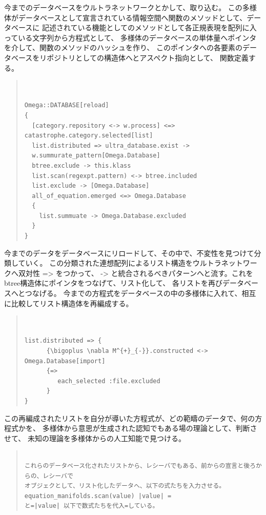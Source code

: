 \documentclass{jsarticle}
\begin{document}
{今までのデータベースをウルトラネットワークとかして、取り込む。
この多様体がデータベースとして宣言されている情報空間へ関数のメソッドとして、データベースに
記述されている機能としてのメソッドとして各正規表現を配列に入っている文字列から方程式として、
多様体のデータベースの単体量へポインタを介して、関数のメソッドのハッシュを作り、
このポインタへの各要素のデータベースをリポジトリとしての構造体へとアスペクト指向として、
関数定義する。

\begin{quote}
\setlength{\baselineskip}{12pt}
\begin{verbatim}


Omega::DATABASE[reload]
{ 
  [category.repository <-> w.process] <=> catastrophe.category.selected[list]
  list.distributed => ultra_database.exist -> 
  w.summurate_pattern[Omega.Database]
  btree.exclude -> this.klass
  list.scan(regexpt.pattern) <-> btree.included
  list.exclude -> [Omega.Database]
  all_of_equation.emerged <=> Omega.Database
  {
    list.summuate -> Omega.Database.excluded
  }
}
\end{verbatim}
\end{quote}
   

今までのデータをデータベースにリロードして、その中で、不変性を見つけて分類していく。
この分類された連想配列によるリスト構造をウルトラネットワークへ双対性 => をつかって、
-> と統合されるべきパターンへと流す。これをbtree構造体にポインタをつなげて、リスト化して、
各リストを再びデータベースへとつなげる。
今までの方程式をデータベースの中の多様体に入れて、相互に比較してリスト構造体を再編成する。

\begin{quote}
\setlength{\baselineskip}{12pt}
\begin{verbatim}


list.distributed => {
      {\bigoplus \nabla M^{+}_{-}}.constructed <-> Omega.Database[import]                 
      {=>
         each_selected :file.excluded
      }
}
\end{verbatim}
\end{quote}

                      
この再編成されたリストを自分が導いた方程式が、どの範疇のデータで、何の方程式かを、
多様体から意思が生成された認知でもある場の理論として、判断させて、
未知の理論を多様体からの人工知能で見つける。

\begin{quote}
\setlength{\baselineskip}{12pt}
\begin{verbatim}

これらのデータベース化されたリストから、レシーバでもある、前からの宣言と後ろからの、レシーバで
オブジェクとして、リスト化したデータへ、以下の式たちを入力させる。equation_manifolds.scan(value) |value| = 
と=|value| 以下で数式たちを代入=している。
\end{verbatim}
\end{quote}

}
\end{document}
